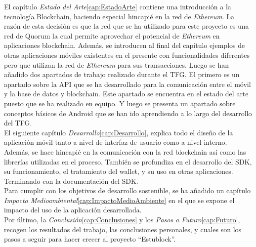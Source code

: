 El capítulo \emph{Estado del Arte}\ref{cap:EstadoArte} contiene una introducción a la tecnología Blockchain, haciendo especial hincapié en la red de \emph{Ethereum}\cite{webEthereum}. La razón de esta decisión es que la red que se ha utilizado para este proyecto es una red de Quorum\cite{webQuorum} la cual permite aprovechar el potencial de \emph{Ethereum} en aplicaciones blockchain. Además, se introducen al final del capítulo ejemplos de otras aplicaciones móviles existentes en el presente con funcionalidades diferentes pero que utilizan la red de \emph{Ethereum} para sus transacciones. Luego se han añadido dos apartados de trabajo realizado durante el TFG. El primero es un apartado sobre la API que se ha desarrollado para la comunicación entre el móvil y la base de datos y blockchain. Este apartado se encuentra en el estado del arte puesto que se ha realizado en equipo. Y luego se presenta un apartado sobre conceptos básicos de Android que se han ido aprendiendo a lo largo del desarrollo del TFG. \\

El siguiente capítulo \emph{Desarrollo}\ref{cap:Desarrollo}, explica todo el diseño de la aplicación móvil tanto a nivel de interfaz de usuario como a nivel interno. Además, se hace hincapié en la comunicación con la red blockchain así como las librerías utilizadas en el proceso. También se profundiza en el desarrollo del SDK, su funcionamiento, el tratamiento del wallet, y su uso en otras aplicaciones. Terminando con la documentación del SDK. \\

Para cumplir con los objetivos de desarrollo sostenible, se ha añadido un capítulo \emph{Impacto Medioambiental}\ref{cap:ImpactoMedioAmbiente} en el que se expone el impacto del uso de la aplicación desarrollada. \\

Por último, la \emph{Conclusión}\ref{cap:Conclusiones} y los \emph{Pasos a Futuro}\ref{cap:Futuro}, recogen los resultados del trabajo, las conclusiones personales, y cuales son los pasos a seguir para hacer crecer al proyecto ``Estublock''.

